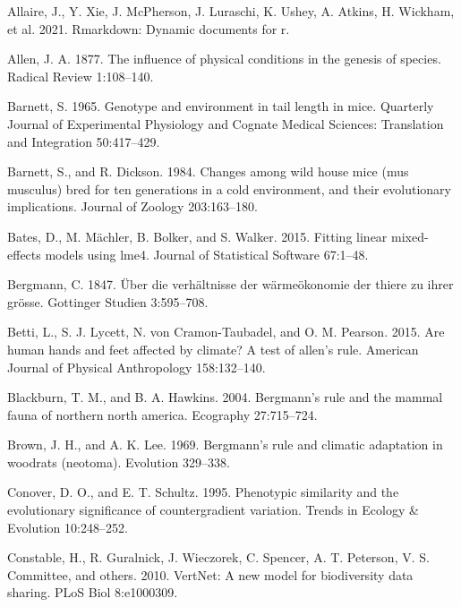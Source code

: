 \documentclass[]{article}
\begin{document}
\leavevmode\hypertarget{ref-Allaire2021}{}%
Allaire, J., Y. Xie, J. McPherson, J. Luraschi, K. Ushey, A. Atkins, H.
Wickham, et al. 2021. Rmarkdown: Dynamic documents for r.

\leavevmode\hypertarget{ref-Allen1877}{}%
Allen, J. A. 1877. The influence of physical conditions in the genesis
of species. Radical Review 1:108--140.

\leavevmode\hypertarget{ref-Barnett1965}{}%
Barnett, S. 1965. Genotype and environment in tail length in mice.
Quarterly Journal of Experimental Physiology and Cognate Medical
Sciences: Translation and Integration 50:417--429.

\leavevmode\hypertarget{ref-Barnett1984}{}%
Barnett, S., and R. Dickson. 1984. Changes among wild house mice (mus
musculus) bred for ten generations in a cold environment, and their
evolutionary implications. Journal of Zoology 203:163--180.

\leavevmode\hypertarget{ref-Bates2015}{}%
Bates, D., M. Mächler, B. Bolker, and S. Walker. 2015. Fitting linear
mixed-effects models using lme4. Journal of Statistical Software
67:1--48.

\leavevmode\hypertarget{ref-Bergmann1847}{}%
Bergmann, C. 1847. Über die verhältnisse der wärmeökonomie der thiere zu
ihrer grösse. Gottinger Studien 3:595--708.

\leavevmode\hypertarget{ref-Betti2015}{}%
Betti, L., S. J. Lycett, N. von Cramon-Taubadel, and O. M. Pearson.
2015. Are human hands and feet affected by climate? A test of allen's
rule. American Journal of Physical Anthropology 158:132--140.

\leavevmode\hypertarget{ref-Blackburn2004}{}%
Blackburn, T. M., and B. A. Hawkins. 2004. Bergmann's rule and the
mammal fauna of northern north america. Ecography 27:715--724.

\leavevmode\hypertarget{ref-Brown1969}{}%
Brown, J. H., and A. K. Lee. 1969. Bergmann's rule and climatic
adaptation in woodrats (neotoma). Evolution 329--338.

\leavevmode\hypertarget{ref-Conover1995}{}%
Conover, D. O., and E. T. Schultz. 1995. Phenotypic similarity and the
evolutionary significance of countergradient variation. Trends in
Ecology \& Evolution 10:248--252.

\leavevmode\hypertarget{ref-Constable2010}{}%
Constable, H., R. Guralnick, J. Wieczorek, C. Spencer, A. T. Peterson,
V. S. Committee, and others. 2010. VertNet: A new model for biodiversity
data sharing. PLoS Biol 8:e1000309.
\end{document}
